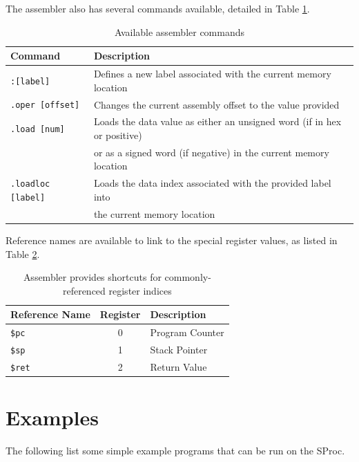 \documentclass{article}
\begin{document}
The assembler also has several commands available, detailed in Table \ref{table:assembler-commands}.

\begin{table}[h!]
	\centering
	\begin{tabular}{l|l}
		\hline
		Command & Description \\
		\hline
		\texttt{:[label]} & Defines a new label associated with the current memory location \\
		\texttt{.oper [offset]} & Changes the current assembly offset to the value provided \\
		\texttt{.load [num]} & Loads the data value as either an unsigned word (if in hex or positive)\\
		& or as a signed word (if negative) in the current memory location \\
		\texttt{.loadloc [label]} & Loads the data index associated with the provided label into \\
		& the current memory location \\
		\hline
	\end{tabular}
	\caption{Available assembler commands}
	\label{table:assembler-commands}
\end{table}

Reference names are available to link to the special register values, as listed in Table \ref{table:assembler-register-references}.

\begin{table}[h!]
	\centering
	\begin{tabular}{l|cl}
		\hline
		Reference Name & Register & Description \\
		\hline
		\texttt{\$pc} & 0 & Program Counter \\
		\texttt{\$sp} & 1 & Stack Pointer \\
		\texttt{\$ret} & 2 & Return Value \\
		\hline
	\end{tabular}
	\caption{Assembler provides shortcuts for commonly-referenced register indices}
	\label{table:assembler-register-references}
\end{table}

\pagebreak

\section{Examples}

The following list some simple example programs that can be run on the SProc.
\end{document}
